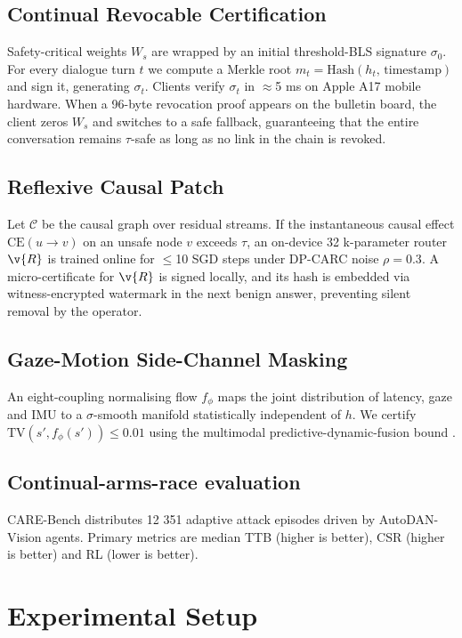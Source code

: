 \documentclass{article}
\begin{document}
\subsection{Continual Revocable Certification}
Safety-critical weights $W_{s}$ are wrapped by an initial threshold-BLS signature $\sigma_{0}$. For every dialogue turn $t$ we compute a Merkle root $m_{t} = \mathrm{Hash}(h_{t},\, \mathrm{timestamp})$ and sign it, generating $\sigma_{t}$. Clients verify $\sigma_{t}$ in $\approx$5 ms on Apple A17 mobile hardware. When a 96-byte revocation proof appears on the bulletin board, the client zeros $W_{s}$ and switches to a safe fallback, guaranteeing that the entire conversation remains $\tau$-safe as long as no link in the chain is revoked.

\subsection{Reflexive Causal Patch}
Let $\mathcal{C}$ be the causal graph over residual streams. If the instantaneous causal effect $\mathrm{CE}(u\to v)$ on an unsafe node $v$ exceeds $\tau$, an on-device 32 k-parameter router $\v{R}$ is trained online for $\leq$10 SGD steps under DP-CARC noise $\rho = 0.3$. A micro-certificate for $\v{R}$ is signed locally, and its hash is embedded via witness-encrypted watermark in the next benign answer, preventing silent removal by the operator.

\subsection{Gaze-Motion Side-Channel Masking}
An eight-coupling normalising flow $f_{\phi}$ maps the joint distribution of latency, gaze and IMU to a $\sigma$-smooth manifold statistically independent of $h$. We certify $\mathrm{TV}(s', f_{\phi}(s')) \leq 0.01$ using the multimodal predictive-dynamic-fusion bound \cite{cao-2024-predictive}.

\subsection{Continual-arms-race evaluation}
CARE-Bench distributes 12 351 adaptive attack episodes driven by AutoDAN-Vision agents. Primary metrics are median TTB (higher is better), CSR (higher is better) and RL (lower is better).

\section{Experimental Setup}
\end{document}
